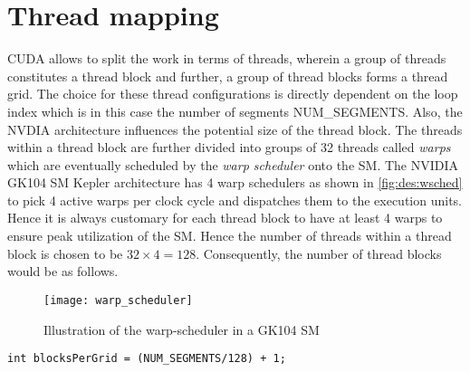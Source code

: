 \section{Thread mapping}\label{sec:tmap}
\gls{CUDA} allows to split the work in terms of threads, wherein a group of threads constitutes a thread block and further, a group of thread blocks forms a thread grid. The choice for these thread configurations is directly dependent on the loop index which is in this case the number of segments NUM\_SEGMENTS. Also, the NVDIA architecture influences the potential size of the thread block. The threads within a thread block are further divided into groups of 32 threads called \textit{warps} which are eventually scheduled by the \textit{warp scheduler} onto the \gls{SM}. The NVIDIA GK104 \gls{SM} Kepler architecture has 4 warp schedulers as shown in \autoref{fig:des:wsched} to pick 4 active warps per clock cycle and dispatches them to the execution units. Hence it is always customary for each thread block to have at least 4 warps to ensure peak utilization of the \gls{SM}. Hence the number of threads within a thread block is chosen to be $32\times 4=128$. Consequently, the number of thread blocks would be as follows.
\begin{figure}[tb]
  \centering
  \texttt{[image: warp\_scheduler]}
  \caption{Illustration of the warp-scheduler in a GK104 \gls{SM}}
  \label{fig:des:wsched}
\end{figure}

\begin{verbatim}
int blocksPerGrid = (NUM_SEGMENTS/128) + 1;
\end{verbatim}

